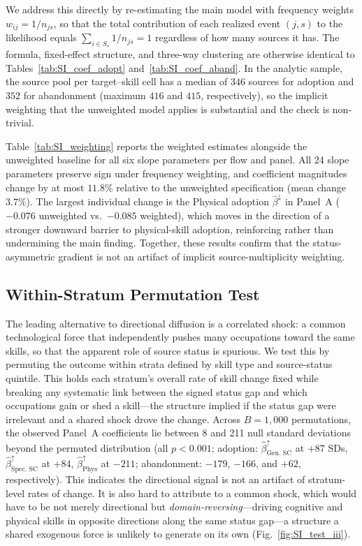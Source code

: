 \documentclass[11pt, letterpaper]{article} %
\begin{document}
We address this directly by re-estimating the main model with frequency weights $w_{ij} = 1/n_{js}$, so that the total contribution of each realized event $(j, s)$ to the likelihood equals
$\sum_{i \in S_s} 1/n_{js} = 1$ regardless of how many sources it has. The formula, fixed-effect structure, and three-way clustering are otherwise identical to Tables~\ref{tab:SI_coef_adopt} and~\ref{tab:SI_coef_aband}. In the analytic sample, the source pool per target--skill cell has a
median of $346$ sources for adoption and $352$ for abandonment (maximum $416$ and $415$, respectively), so the implicit weighting that the unweighted model applies is substantial and the check is non-trivial.

Table~\ref{tab:SI_weighting} reports the weighted estimates alongside the unweighted baseline for all six slope parameters per flow and panel. All 24 slope parameters preserve sign under frequency weighting, and coefficient magnitudes change by at most $11.8\%$ relative to the unweighted specification (mean change $3.7\%$). The largest individual change is the Physical adoption $\hat{\beta}^{\downarrow}$ in Panel~A ($-0.076$ unweighted vs.\ $-0.085$ weighted), which moves in the direction of a stronger downward barrier to physical-skill adoption, reinforcing rather than undermining the main finding. Together, these results confirm that the status-asymmetric gradient is not an artifact of implicit source-multiplicity weighting.



\subsection{Within-Stratum Permutation Test}
\label{sec:SI_permutation}

The leading alternative to directional diffusion is a correlated shock: a common technological force that independently pushes many occupations toward the same skills, so that the apparent role of source status is spurious. We test this by permuting the outcome within strata defined by skill type and source-status quintile. This holds each stratum's overall rate of skill change fixed while breaking any systematic link between the signed status gap and which occupations gain or shed a skill---the structure implied if the status gap were irrelevant and a shared shock drove the change. Across $B = 1{,}000$ permutations, the observed Panel~A coefficients lie between 8 and 211 null standard deviations beyond the permuted distribution (all $p < 0.001$; adoption: $\hat{\beta}^{\uparrow}_{\text{Gen. SC}}$ at $+87$ SDs, $\hat{\beta}^{\uparrow}_{\text{Spec. SC}}$ at $+84$, $\hat{\beta}^{\uparrow}_{\text{Phys}}$ at $-211$; abandonment: $-179$, $-166$, and $+62$, respectively). This indicates the directional signal is not an artifact of stratum-level rates of change. It is also hard to attribute to a common shock, which would have to be not merely directional but \emph{domain-reversing}---driving cognitive and physical skills in opposite directions along the same status gap---a structure a shared exogenous force is unlikely to generate on its own (Fig.~\ref{fig:SI_test_iii}).
\end{document}
